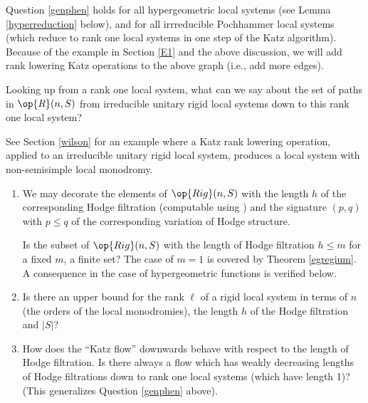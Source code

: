  Question \ref{genphen} holds  for all hypergeometric local systems (see Lemma \ref{hyperreduction} below), and for all  irrreducible Pochhammer local systems (which reduce to rank one local systems in one step of the Katz algorithm).  Because of  the example  in Section \ref{E1} and the above discussion, we will add rank lowering Katz operations to the above graph (i.e., add more edges).
 \begin{question}
\notready\label{information}
Looking up from a rank one local system, what can we say about the set of paths in  $\op{R}(n,S)$ from  irreducible unitary rigid local systems down to this rank one local system?
\end{question}

See Section \ref{wilson} for an example where a Katz rank lowering operation, applied to an irreducible unitary rigid local system, produces a local system with non-semisimple local monodromy.

\begin{question}
\notready\label{Q2}

\begin{enumerate}
\item[(A)] We may decorate the elements of  $\op{Rig}(n,S)$ with the length $h$ of the corresponding Hodge filtration  (computable using \cite{DS}) and the signature $(p,q)$ with $p\leq q$ of the corresponding variation of Hodge structure.

 Is the subset of  $\op{Rig}(n,S)$  with the length of Hodge filtration $h\leq m$ for a fixed $m$, a finite set?  The case of $m=1$  is covered by Theorem \ref{egregium}.  A consequence  in the case of hypergeometric functions is verified below.
\item[(B)] Is there an upper bound for the rank $\ell$ of a rigid local system in terms of $n$ (the orders of the local monodromies), the length  $h$ of the Hodge filtration and  $|S|$?


\item[(C)] How does the ``Katz flow''  downwards behave with respect to the length of Hodge filtration. Is there always a flow which has weakly decreasing lengths of Hodge filtrations down to rank one local systems (which have length 1)?
(This generalizes Question \ref{genphen} above).
\end{enumerate}
\end{question}


